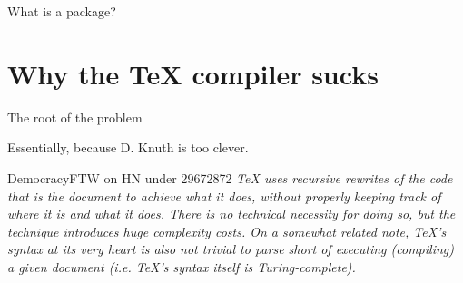 \documentclass[xetex, onlymath, handout]{beamer}
\begin{document}
\begin{frame}[fragile]{What is a package?}
\begin{figure}[H]
  \end{figure}
\end{frame}

\section{Why the \TeX{} compiler sucks}

\begin{frame}{The root of the problem}
  
  {\Large 
    Essentially, because D. Knuth is too clever.
  }
  
  \begin{block}{DemocracyFTW on HN under 29672872}
    \itshape
    TeX uses recursive rewrites of the code that is the document to achieve
    what it does, without properly keeping track of where it is and what it
    does. There is no technical necessity for doing so, but the technique
    introduces huge complexity costs. On a somewhat related note, TeX's syntax
    at its very heart is also not trivial to parse short of executing
    (compiling) a given document (i.e. TeX's syntax itself is Turing-complete).
  \end{block}
\end{frame}
\end{document}
